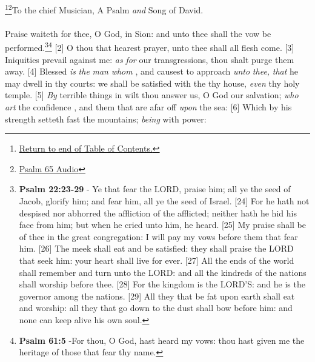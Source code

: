 \footnote{\textcolor[rgb]{0.00,0.25,0.00}{\hyperlink{TOC}{Return to end of Table of Contents.}}}\footnote{\href{https://audiobible.com/bible/psalms_65.html}{\textcolor[cmyk]{0.99998,1,0,0}{Psalm 65 Audio}}}\textcolor[cmyk]{0.99998,1,0,0}{To the chief Musician, A Psalm \emph{and} Song of David.}\\
\\
\textcolor[cmyk]{0.99998,1,0,0}{Praise waiteth for thee, O God, in Sion: and unto thee shall the vow be performed.}\footnote{\textbf{Psalm 22:23-29} - Ye that fear the LORD, praise him; all ye the seed of Jacob, glorify him; and fear him, all ye the seed of Israel. [24] For he hath not despised nor abhorred the affliction of the afflicted; neither hath he hid his face from him; but when he cried unto him, he heard. [25] My praise shall be of thee in the great congregation: I will pay my vows before them that fear him. [26] The meek shall eat and be satisfied: they shall praise the LORD that seek him: your heart shall live for ever. [27] All the ends of the world shall remember and turn unto the LORD: and all the kindreds of the nations shall worship before thee. [28] For the kingdom is the LORD’S: and he is the governor among the nations. [29] All they that be fat upon earth shall eat and worship: all they that go down to the dust shall bow before him: and none can keep alive his own soul.}\footnote{\textbf{Psalm 61:5} -For thou, O God, hast heard my vows: thou hast given me the heritage of those that fear thy name.}
[2] \textcolor[cmyk]{0.99998,1,0,0}{O thou that hearest prayer, unto thee shall all flesh come.}
[3] \textcolor[cmyk]{0.99998,1,0,0}{Iniquities prevail against me: \emph{as} \emph{for} our transgressions, thou shalt purge them away.}
[4] \textcolor[cmyk]{0.99998,1,0,0}{Blessed \emph{is} \emph{the} \emph{man} \emph{whom} , and causest to approach \emph{unto} \emph{thee,} \emph{that} he may dwell in thy courts: we shall be satisfied with the   thy house, \emph{even}  thy holy temple.}
[5] \textcolor[cmyk]{0.99998,1,0,0}{\emph{By} terrible things in  wilt thou answer us, O God  our salvation; \emph{who} \emph{art} the confidence , and  them that are afar off \emph{upon} the sea:}
[6] \textcolor[cmyk]{0.99998,1,0,0}{Which by his strength setteth fast the mountains; \emph{being}  with power:}
